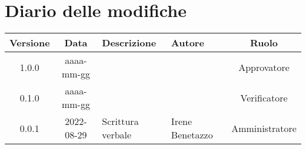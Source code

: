 \section*{Diario delle modifiche}
	\begin{center}
	\renewcommand{\arraystretch}{1.8} %
	\begin{tabular}{ |c|c|m{12em}|m{7em}|c| }
	\hline
	\textbf{Versione} & \textbf{Data} & \textbf{Descrizione} &  \textbf{Autore} &  \textbf{Ruolo} \\ %
	\hline
	1.0.0 & aaaa-mm-gg & & & Approvatore\\
	\hline
	0.1.0 & aaaa-mm-gg & & & Verificatore\\
	\hline
    0.0.1 & 2022-08-29 & Scrittura verbale & Irene Benetazzo & Amministratore\\ %
	\hline
	\end{tabular}
	\end{center}
	\newpage